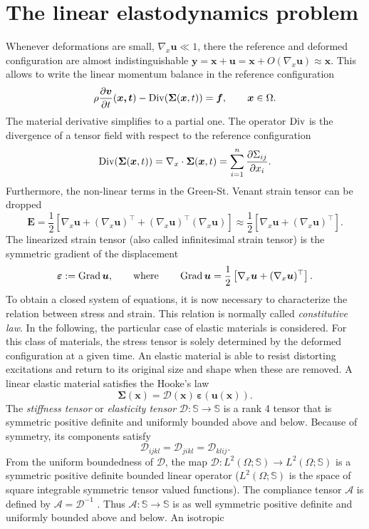 \section{The linear elastodynamics problem}
Whenever deformations are small, $\nabla_x\bm{u} \ll 1$, there the reference and deformed configuration are almost indistinguishable $\bm{y} = \bm{x} + \bm{u} = \bm{x}  + O(\nabla_x\bm{u}) \approx \bm{x}$. This allows to write the linear momentum balance in the reference configuration
\begin{equation*}
	\rho \diffp{\bm{v}}{t}(\bm{x, t}) - \Div(\bm\Sigma(\bm{x}, t)) = \bm{f}, \qquad \bm{x} \in \Omega.
\end{equation*}
The material derivative simplifies to a partial one. The operator $\operatorname*{Div}$ is the divergence of a tensor field with respect to the reference configuration
\[
\Div(\bm\Sigma(\bm{x}, t)) = \nabla_x \cdot \bm\Sigma(\bm{x}, t) = \sum_{i=1}^{n}\diffp{\Sigma_{ij}}{x_i}.
\]
Furthermore, the non-linear terms in the Green-St. Venant strain tensor can be dropped
\[
\bm{E} = \frac{1}{2}\left[\nabla_x \bm{u} + (\nabla_x \bm{u})^\top + (\nabla_x \bm{u})^\top (\nabla_x \bm{u})\right]
\approx \frac{1}{2}\left[\nabla_x \bm{u} + (\nabla_x \bm{u})^\top\right].
\]
The linearized strain tensor (also called infinitesimal strain tensor) is the symmetric gradient of the displacement
\[
\bm{\varepsilon} := \operatorname*{Grad}\bm{u}, \qquad \text{where} \qquad \operatorname*{Grad}\bm{u} = \frac{1}{2}\left[\nabla_x \bm{u} + (\nabla_x \bm{u})^\top\right].
\]
To obtain a closed system of equations, it is now necessary to characterize the relation between stress and strain. This relation is normally called \textit{constitutive law}. In the following, the particular case of elastic materials is considered. For this class of materials, the stress tensor is solely determined by the deformed configuration at a given time. An elastic material is able to resist distorting excitations and return to its original size and shape when these are removed. A linear elastic material satisfies the Hooke's law
\[
\bm{\Sigma}(\bm{x}) = \bm{\mathcal{D}}(\bm{x}) \, \bm{\varepsilon}(\bm{u}(\bm{x})).
\]
The \textit{stiffness tensor} or \textit{elasticity tensor} $\bm{\mathcal{D}} : \mathbb{S} \rightarrow \mathbb{S}$ is a rank 4 tensor that is symmetric positive definite and uniformly bounded above and below. Because of symmetry, its components satisfy
\[
\mathcal{D}_{ijkl} = \mathcal{D}_{jikl} = \mathcal{D}_{klij}.
\]
From the uniform boundedness of $\bm{\mathcal{D}}$, the map
$\bm{\mathcal{D}}: L^2 (\Omega; \mathbb{S}) \rightarrow L^2 (\Omega; \mathbb{S})$ is a symmetric positive definite bounded linear operator ($L^2 (\Omega; \mathbb{S})$ is the space of square integrable symmetric tensor valued functions). The compliance tensor $\bm{\mathcal{A}}$ is defined by $\bm{\mathcal{A}} = \bm{\mathcal{D}}^{-1}$ . Thus $\bm{\mathcal{A}} : \mathbb{S} \rightarrow \mathbb{S}$ is as well symmetric positive definite and uniformly bounded above and below. An isotropic
